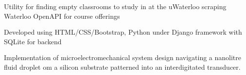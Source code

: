 \documentclass[letterpaper]{deedy-resume}
\begin{document}
\begin{minipage}[t]{0.66\textwidth}
\sectionspace %



\begin{tightitemize}
\item Utility for finding empty classrooms to study in at the uWaterloo scraping Waterloo OpenAPI for course offerings
\item Developed using HTML/CSS/Bootstrap, Python under Django framework with SQLite for backend
\end{tightitemize}

\sectionspace %


\begin{tightitemize}
\item Implementation of microelectromechanical system design navigating a nanolitre fluid droplet om a silicon substrate patterned into an interdigitated transducer.
\end{tightitemize}

\sectionspace %








\end{minipage}
\end{document}
